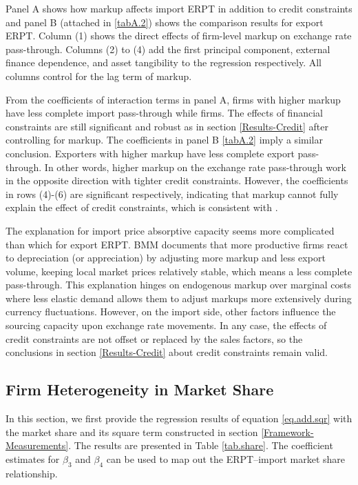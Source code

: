 \documentclass[12pt]{article}
\begin{document}
Panel A shows how markup affects import ERPT in addition to credit constraints and panel B (attached in \ref{tabA.2}) shows the comparison results for export ERPT. Column (1) shows the direct effects of firm-level markup on exchange rate pass-through. Columns (2) to (4) add the first principal component, external finance dependence, and asset tangibility to the regression respectively. All columns control for the lag term of markup.

From the coefficients of interaction terms in panel A, firms with higher markup have less complete import pass-through while firms. The effects of financial constraints are still significant and robust as in section \ref{Results-Credit} after controlling for markup. The coefficients in panel B \ref{tabA.2} imply a similar conclusion. Exporters with higher markup have less complete export pass-through. In other words, higher markup on the exchange rate pass-through work in the opposite direction with tighter credit constraints. However, the coefficients in rows (4)-(6) are significant respectively, indicating that markup cannot fully explain the effect of credit constraints, which is consistent with \cite{xu-guo2021}.

The explanation for import price absorptive capacity seems more complicated than which for export ERPT. BMM\cite{bmm2012} documents that more productive firms react to depreciation (or appreciation) by adjusting more markup and less export volume, keeping local market prices relatively stable, which means a less complete pass-through. This explanation hinges on endogenous markup over marginal costs where less elastic demand allows them to adjust markups more extensively during currency fluctuations. However, on the import side, other factors influence the sourcing capacity upon exchange rate movements. In any case, the effects of credit constraints are not offset or replaced by the sales factors, so the conclusions in section \ref{Results-Credit} about credit constraints remain valid.

\subsection{Firm Heterogeneity in Market Share}

In this section, we first provide the regression results of equation \ref{eq.add.sqr} with the market share and its square term constructed in section \ref{Framework-Measurements}. The results are presented in Table \ref{tab.share}. The coefficient estimates for $\beta_3$ and $\beta_4$ can be used to map out the ERPT–import market share relationship.
\end{document}
